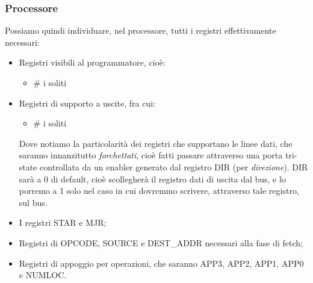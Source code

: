 \documentclass[a4paper,11pt]{article}
\begin{document}
\subsubsection{Processore}
Possiamo quindi individuare, nel processore, tutti i registri effettivamente necessari:
\begin{itemize}
	\item Registri visibili al programmatore, cioè:
		\begin{itemize}
			\item # i soliti
		\end{itemize}
	\item Registri di supporto a uscite, fra cui:
		\begin{itemize}
			\item # i soliti
		\end{itemize}
		Dove notiamo la particolarità dei registri che supportano le linee dati, che saranno innanzitutto \textit{forchettati}, cioè fatti passare attraverso una porta tri-state controllata da un enabler generato dal registro DIR (per \textit{direzione}).
		DIR sarà a 0 di default, cioè scollegherà il registro dati di uscita dal bus, e lo porremo a 1 solo nel caso in cui dovremmo scrivere, attraverso tale registro, sul bus.
	\item I registri STAR e MJR;
	\item Registri di OPCODE, SOURCE e DEST\_ADDR necessari alla fase di fetch;
	\item Registri di appoggio per operazioni, che saranno APP3, APP2, APP1, APP0 e NUMLOC.
\end{itemize}
\end{document}
